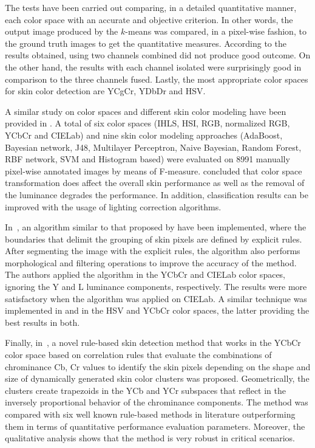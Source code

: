 The tests have been carried out comparing, in a detailed quantitative manner, each color space with an accurate and objective criterion. In other words, the output image produced by the $k$-means was compared, in a pixel-wise fashion, to the ground truth images to get the quantitative measures. According to the results obtained, using two channels combined did not produce good outcome. On the other hand, the results with each channel isolated were surprisingly good in comparison to the three channels fused. Lastly, the most appropriate color spaces for skin color detection are YCgCr, YDbDr and HSV.

A similar study on color spaces and different skin color modeling have been provided in \citep{khan:12}. A total of six color spaces (IHLS, HSI, RGB, normalized RGB, YCbCr and CIELab) and nine skin color modeling approaches (AdaBoost, Bayesian network, J48, Multilayer Perceptron, Naive Bayesian, Random Forest, RBF network, SVM and Histogram based) were evaluated on 8991 manually pixel-wise annotated images by means of F-measure. \citet{khan:12} concluded that color space transformation does affect the overall skin performance as well as the removal of the luminance degrades the performance. In addition, classification results can be improved with the usage of lighting correction algorithms.

In~\citet{kaur:12}, an algorithm similar to that proposed by \citet{kovac:03} have been implemented, where the boundaries that delimit the grouping of skin pixels are defined by explicit rules. After segmenting the image with the explicit rules, the algorithm also performs morphological and filtering operations to improve the accuracy of the method. The authors applied the algorithm in the YCbCr and CIELab color spaces, ignoring the Y and L luminance components, respectively. The results were more satisfactory when the algorithm was applied on CIELab. A similar technique was implemented in \citet{shaik:15} and \citet{kumar:15} in the HSV and YCbCr color spaces, the latter providing the best results in both.

Finally, in~\citet{brancati:17}, a novel rule-based skin detection method that works in the YCbCr color space based on correlation rules that evaluate the combinations of chrominance Cb, Cr values to identify the skin pixels depending on the shape and size of dynamically generated skin color clusters was proposed. Geometrically, the clusters create trapezoids in the YCb and YCr subspaces that reflect in the inversely proportional behavior of the chrominance components. The method was compared with six well known rule-based methods in literature outperforming them in terms of quantitative performance evaluation parameters. Moreover, the qualitative analysis shows that the method is very robust in critical scenarios.
